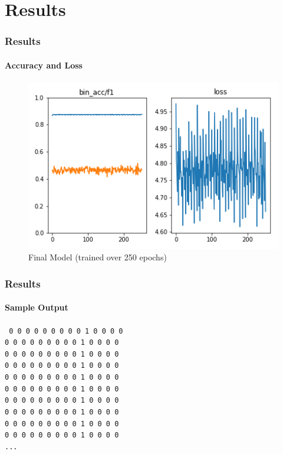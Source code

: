 \newcommand{\overtitle}{Results}
\section{Results}


\begin{frame}
	\frametitle{\overtitle}
	\framesubtitle{Accuracy and Loss}
	\begin{figure}
		\includegraphics[width=\textwidth]{images/final_model.png}
		\caption{Final Model (trained over 250 epochs)}
	\end{figure}
\end{frame}

\begin{frame}
	\frametitle{\overtitle}
	\framesubtitle{Sample Output}
	\begin{centering}
	\texttt{%
		0 0 0 0 0 0 0 0 0 1 0 0 0 0 \\
		0 0 0 0 0 0 0 0 0 1 0 0 0 0 \\
		0 0 0 0 0 0 0 0 0 1 0 0 0 0 \\
		0 0 0 0 0 0 0 0 0 1 0 0 0 0 \\
		0 0 0 0 0 0 0 0 0 1 0 0 0 0 \\
		0 0 0 0 0 0 0 0 0 1 0 0 0 0 \\
		0 0 0 0 0 0 0 0 0 1 0 0 0 0 \\
		0 0 0 0 0 0 0 0 0 1 0 0 0 0 \\
		0 0 0 0 0 0 0 0 0 1 0 0 0 0 \\
		0 0 0 0 0 0 0 0 0 1 0 0 0 0 \\
		...
		}
	\end{centering}
\end{frame}

